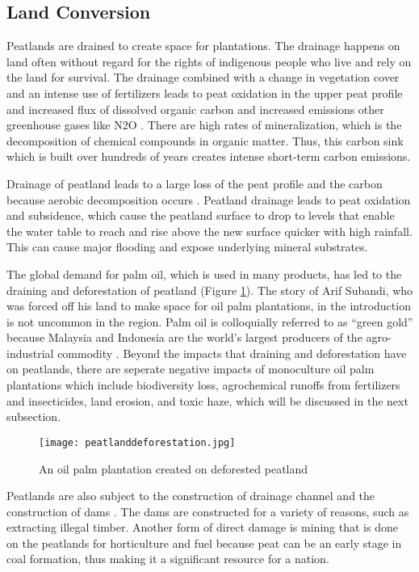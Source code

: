 \subsection{Land Conversion}

Peatlands are drained to create space for plantations. The drainage happens on land often without regard for the rights of indigenous people who live and rely on the land for survival. The drainage combined with a change in vegetation cover and an intense use of fertilizers leads to peat oxidation in the upper peat profile and increased flux of dissolved organic carbon and increased emissions other greenhouse gases like N2O \citep{larmola2013vegetation}. There are high rates of mineralization, which is the decomposition of chemical compounds in organic matter. Thus, this carbon sink which is built over hundreds of years creates intense short-term carbon emissions. 

Drainage of peatland leads to a large loss of the peat profile and the carbon because aerobic decomposition occurs \citep{page2009restoration}. Peatland drainage leads to peat oxidation and subsidence, which cause the peatland surface to drop to levels that enable the water table to reach and rise above the new surface quicker with high rainfall. This can cause major flooding and expose underlying mineral substrates. 

The global demand for palm oil, which is used in many products, has led to the draining and deforestation of peatland (Figure \ref{fig:peatlanddeforestation}). The story of Arif Subandi, who was forced off his land to make space for oil palm plantations, in the introduction is not uncommon in the region. Palm oil is colloquially referred to as ``green gold'' because Malaysia and Indonesia are the world's largest producers of the agro-industrial commodity \citep{othman2003linking}. Beyond the impacts that draining and deforestation have on peatlands, there are seperate negative impacts of monoculture oil palm plantations which include biodiversity loss, agrochemical runoffs from fertilizers and insecticides, land erosion, and toxic haze, which will be discussed in the next subsection.  

\begin{figure}
  \texttt{[image: peatlanddeforestation.jpg]}
  \caption{An oil palm plantation created on deforested peatland}
  \label{fig:peatlanddeforestation}
\end{figure}

Peatlands are also subject to the construction of drainage channel and the construction of dams \citep{suyanto2004role}. The dams are constructed for a variety of reasons, such as extracting illegal timber. Another form of direct damage is mining that is done on the peatlands for horticulture and fuel because peat can be an early stage in coal formation, thus making it a significant resource for a nation. 

